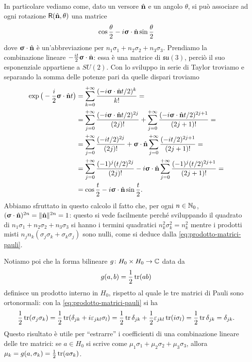 In particolare vediamo come, dato un versore $\hat{\mathbf{n}}$ e un angolo $\theta$, si può associare ad ogni rotazione $\mathsf{R}(\hat{\mathbf{n}},\theta)$ una matrice
\begin{equation}
	\cos\frac{\theta}2-i{\bm{\upsigma}}\cdot{\hat{\mathbf{n}}}\sin\frac{\theta}2
\end{equation}
dove ${\bm{\upsigma}}\cdot{\hat{\mathbf{n}}}$ è un'abbreviazione per $n_1\sigma_1+n_2\sigma_2+n_3\sigma_3$.
Prendiamo la combinazione lineare $-\frac{it}2{\bm{\upsigma}}\cdot{\hat{\mathbf{n}}}$: essa è una matrice di $\mathfrak{su}(3)$, perciò il suo esponenziale appartiene a $SU(2)$.
Con lo sviluppo in serie di Taylor troviamo e separando la somma delle potenze pari da quelle dispari troviamo
\begin{equation}
	\begin{split}
		\exp\big(-\frac{i}2{\bm{\upsigma}}\cdot{\hat{\mathbf{n}}}t\big)&=\sum_{k=0}^{+\infty}\frac{(-i{\bm{\upsigma}}\cdot{\hat{\mathbf{n}}}t/2)^k}{k!}=\\
		&=\sum_{j=0}^{+\infty}\frac{(-i{\bm{\upsigma}}\cdot{\hat{\mathbf{n}}}t/2)^{2j}}{(2j)!}+\sum_{j=0}^{+\infty}\frac{(-i{\bm{\upsigma}}\cdot{\hat{\mathbf{n}}}t/2)^{2j+1}}{(2j+1)!}=\\
		&=\sum_{j=0}^{+\infty}\frac{(-it/2)^{2j}}{(2j)!}+{\bm{\upsigma}}\cdot{\hat{\mathbf{n}}}\sum_{j=0}^{+\infty}\frac{(-it/2)^{2j+1}}{(2j+1)!}=\\
		&=\sum_{j=0}^{+\infty}\frac{(-1)^j(t/2)^{2j}}{(2j)!}-i{\bm{\upsigma}}\cdot{\hat{\mathbf{n}}}\sum_{j=0}^{+\infty}\frac{(-1)^j(t/2)^{2j+1}}{(2j+1)!}=\\
		&=\cos\frac{t}2-i{\bm{\upsigma}}\cdot{\hat{\mathbf{n}}}\sin\frac{t}2.
	\end{split}
	\label{eq:formula-eulero-SU2}
\end{equation}
Abbiamo sfruttato in questo calcolo il fatto che, per ogni $n\in\mathbb{N}_0$, $({\bm{\upsigma}}\cdot{\hat{\mathbf{n}}})^{2n}=\lVert\hat{\mathbf{n}}\rVert^{2n}=1$: questo si vede facilmente perch\'e sviluppando il quadrato di $n_1\sigma_1+n_2\sigma_2+n_3\sigma_3$ si hanno i termini quadratici $n_k^2\sigma_k^2=n_k^2$ mentre i prodotti misti $n_jn_k(\sigma_j\sigma_k+\sigma_k\sigma_j)$ sono nulli, come si deduce dalla \eqref{eq:prodotto-matrici-pauli}.

Notiamo poi che la forma bilineare $g\colon H_0\times H_0\to\mathbb{C}$ data da
\begin{equation}
	g(a,b)=\frac12\operatorname{tr}(ab)
	\label{eq:prodotto-interno-matrici-pauli}
\end{equation}
definisce un prodotto interno in $H_0$, rispetto al quale le tre matrici di Pauli sono ortonormali: con la \eqref{eq:prodotto-matrici-pauli} si ha
\begin{equation}
	\frac12\operatorname{tr}(\sigma_j\sigma_k)=\frac12\operatorname{tr}(\delta_{jk}+i\varepsilon_{jkl}\sigma_l)=\frac12\operatorname{tr}\delta_{jk}+\frac12\varepsilon_{jkl}\operatorname{tr}(i\sigma_l)=\frac12\operatorname{tr}\delta_{jk}=\delta_{jk}.
\end{equation}
Questo risultato è utile per ``estrarre'' i coefficienti di una combinazione lineare delle tre matrici: se $a\in H_0$ si scrive come $\mu_1\sigma_1+\mu_2\sigma_2+\mu_3\sigma_3$, allora $\mu_k=g(a,\sigma_k)=\frac12\operatorname{tr}(a\sigma_k)$.

